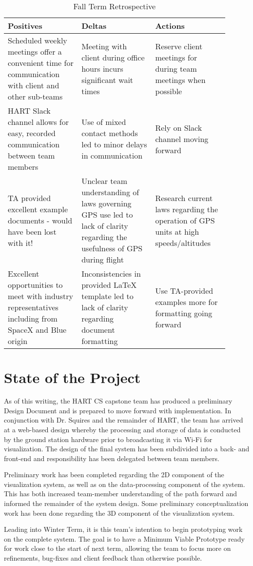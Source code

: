 \documentclass[journal,10pt,onecolumn,compsoc]{IEEEtran}
\begin{document}
\begin{center}
\begin{table}[h!]
\begin{tabular}{|p{0.3\linewidth}|p{0.3\linewidth}|p{0.3\linewidth}|} 
	\hline
	\textbf{Positives} & \textbf{Deltas} & \textbf{Actions} \\
	\hline
	Scheduled weekly meetings offer a convenient time for communication with client and other sub-teams & Meeting with client during office hours incurs significant wait times & Reserve client meetings for during team meetings when possible \\ 
	\hline
	HART Slack channel allows for easy, recorded communication between team members & Use of mixed contact methods led to minor delays in communication & Rely on Slack channel moving forward \\ 
	\hline
	TA provided excellent example documents - would have been lost with it! & Unclear team understanding of laws governing GPS use led to lack of clarity regarding the usefulness of GPS during flight  & Research current laws regarding the operation of GPS units at high speeds/altitudes \\
	\hline
	Excellent opportunities to meet with industry representatives including from SpaceX and Blue origin & Inconsistencies in provided LaTeX template led to lack of clarity regarding document formatting & Use TA-provided examples more for formatting going forward \\
	\hline
\end{tabular}
\caption{Fall Term Retrospective}
\label{table:1}
\end{table}
\end{center}
\newpage

\section{State of the Project}
	As of this writing, the HART CS capstone team has produced a preliminary Design Document and is prepared to move forward with implementation.
	In conjunction with Dr. Squires and the remainder of HART, the team has arrived at a web-based design whereby the processing and storage of data is conducted by the ground station hardware prior to broadcasting it via Wi-Fi for visualization.
	The design of the final system has been subdivided into a back- and front-end and responsibility has been delegated between team members.
	
	\noindent Preliminary work has been completed regarding the 2D component of the visualization system, as well as on the data-processing component of the system.
	This has both increased team-member understanding of the path forward and informed the remainder of the system design.
	Some preliminary conceptualization work has been done regarding the 3D component of the visualization system.
	
	\noindent Leading into Winter Term, it is this team's intention to begin prototyping work on the complete system.
	The goal is to have a Minimum Viable Prototype ready for work close to the start of next term, allowing the team to focus more on refinements, bug-fixes and client feedback than otherwise possible.
	
\end{document}
